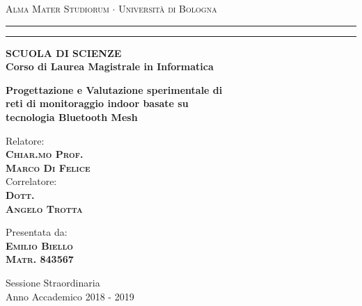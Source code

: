     \begin{titlepage}
        \begin{center}
            {{\Large{\textsc{Alma Mater Studiorum $\cdot$ Università di Bologna}}}}
            \rule[0.1cm]{15.8cm}{0.1mm}
            \rule[0.5cm]{15.8cm}{0.6mm}
            {\small{\bf SCUOLA DI SCIENZE\\
            Corso di Laurea Magistrale in Informatica }}
        \end{center}
        
        \vspace{20mm}
        \begin{center}
            {\LARGE{\bf Progettazione e Valutazione sperimentale di}}\\
            \vspace{3mm}
            {\LARGE{\bf reti di monitoraggio indoor basate su}}\\
            \vspace{3mm}
            {\LARGE{\bf tecnologia Bluetooth Mesh}}\\
        \end{center}
        \vspace{30mm}
        \par
        \noindent
        \begin{minipage}[t]{0.47\textwidth}
            {\large{\sc Relatore:}\\
            {\bf\textsc{Chiar.mo Prof.\\
            Marco Di Felice}}}\\
            \vskip 8pt
            {\large{\sc Correlatore:}\\
            {\bf\textsc{Dott.\\Angelo Trotta}}}
        \end{minipage}
        \hfill
        \begin{minipage}[t]{0.47\textwidth}\raggedleft
            {\large{\sc Presentata da:}\\
            \vspace{0.5mm}
            {\bf\textsc{Emilio Biello}}}\\
            {\bf \textsc{Matr. 843567}}
        \end{minipage}
        
        \vfill
        \begin{center}
            {\large{\sc Sessione Straordinaria\\%
            \vspace{2mm}
                Anno Accademico 2018 - 2019}}%
        \end{center}
    \end{titlepage}
\restoregeometry